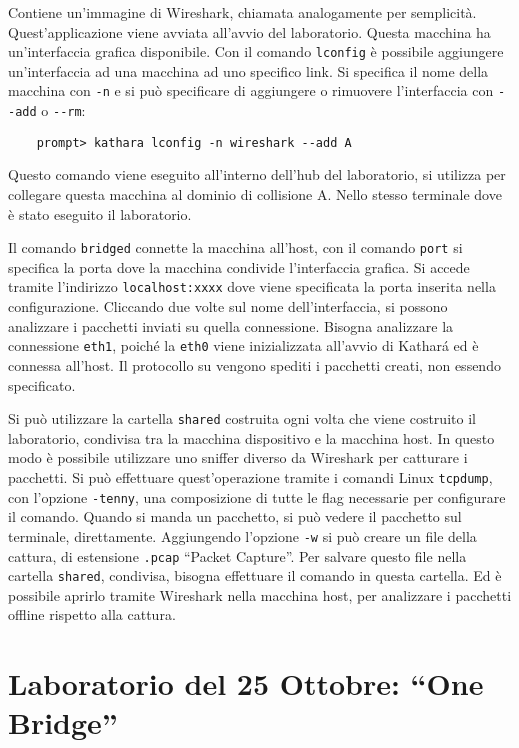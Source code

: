 \documentclass{article}
\numberwithin{equation}{subsection}
\begin{document}
Contiene un'immagine di Wireshark, chiamata analogamente per semplicità. Quest'applicazione viene avviata all'avvio del laboratorio. Questa macchina ha un'interfaccia grafica 
disponibile. Con il comando \verb|lconfig| è possibile aggiungere un'interfaccia ad una macchina ad uno specifico link. Si specifica il nome della macchina con \verb|-n| e 
si può specificare di aggiungere o rimuovere l'interfaccia con \verb|--add| o \verb|--rm|:
\begin{verbatim}
    prompt> kathara lconfig -n wireshark --add A
\end{verbatim}
Questo comando viene eseguito all'interno dell'hub del laboratorio, si utilizza per collegare questa macchina al dominio di collisione A. Nello stesso terminale dove 
è stato eseguito il laboratorio. 


Il comando \verb|bridged| connette la macchina all'host, con il comando \verb|port| si specifica la porta dove la macchina condivide l'interfaccia grafica. Si 
accede tramite l'indirizzo \verb|localhost:xxxx| dove viene specificata la porta inserita nella configurazione. 
Cliccando due volte sul nome dell'interfaccia, si possono analizzare i pacchetti inviati su quella connessione. Bisogna analizzare la connessione \verb|eth1|, poiché la 
\verb|eth0| viene inizializzata all'avvio di Kathar\'{a} ed è connessa all'host. 
Il protocollo su vengono spediti i pacchetti creati, non essendo specificato. 


Si può utilizzare la cartella \verb|shared| costruita ogni volta che viene costruito il laboratorio, condivisa tra la macchina dispositivo e la macchina host. In 
questo modo è possibile utilizzare uno sniffer diverso da Wireshark per catturare i pacchetti. Si può effettuare quest'operazione tramite i comandi Linux \verb|tcpdump|, 
con l'opzione \verb|-tenny|, una composizione di tutte le flag necessarie per configurare il comando. Quando si manda un pacchetto, si può vedere il pacchetto sul terminale, 
direttamente. Aggiungendo l'opzione \verb|-w| si può creare un file della cattura, di estensione \verb|.pcap| ``Packet Capture''. Per salvare questo file nella cartella 
\verb|shared|, condivisa, bisogna effettuare il comando in questa cartella. Ed è possibile aprirlo tramite Wireshark nella macchina host, per analizzare i pacchetti 
offline rispetto alla cattura. 

\clearpage

\section{Laboratorio del 25 Ottobre: ``One Bridge''}
\end{document}
